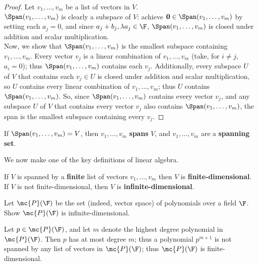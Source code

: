 \documentclass[math0540-lecture-notes.tex]{subfiles}
\begin{document}
\begin{proof}[Proof]
  Let $v_1,\ldots,v_m$ be a list of vectors in $V$.\\

  $\Span(v_1,\ldots,v_m)$ is clearly a subspace of $V$: achieve $\textbf{0}\in
  \Span(v_1,\ldots,v_m)$ by setting each $a_j=0$, and since $a_j+b_j,\lambda a_j\in \F$,
  $\Span(v_1,\ldots,v_m)$  is closed under addition and scalar multiplication.\\

  Now, we show that $\Span(v_1,\ldots,v_m)$ is the smallest subspace containing  $v_1,\ldots,v_m$.
  Every vector $v_j$ is a linear combination of $  v_1,\ldots,v_m$ (take, for $i\neq j$, $a_i=0$);
  thus $\Span(v_1,\ldots,v_m)$ contains each $v_j$. Additionally, every subspace $U$ of $V$ that
  contains each $v_j\in U$ is closed under addition and scalar multiplication, so $U$ contains every
  linear combination of $ v_1,\ldots,v_m$; thus $U$ contains $\Span(v_1,\ldots,v_m)$. So, since
  $\Span(v_1,\ldots,v_m)$ contains every vector $v_j$, and any subspace $U$ of $V$ that contains
  every vector $v_j$ also contains $\Span(v_1,\ldots,v_m)$, the span is the smallest subspace
  containing every $v_j$.
\end{proof}

\begin{definition}{}
  If $\Span(v_1,\ldots,v_m)=V$, then $ v_1,\ldots,v_m$ \textbf{spans} $V$, and $v_1,\ldots,v_m$ are
  a \textbf{spanning set}.
\end{definition}

We now make one of the key definitions of linear algebra.

\begin{definition}{}
  If $V$ is spanned by a \textbf{finite} list of vectors $v_1,\ldots,v_m$ then $V$ is
  \textbf{finite-dimensional}.\\

  If $V$ is not finite-dimensional, then $V$ is \textbf{infinite-dimensional}.
\end{definition}

\begin{example}
  Let $\mc{P}(\F)$ be the set (indeed, vector space) of polynomials over a field $\F$. Show
  $\mc{P}(\F)$ is infinite-dimensional.
\end{example}
\begin{solution}
  Let $p\in \mc{P}(\F)$, and let $m$ denote the highest degree polynomial in $\mc{P}(\F)$. Then $p$ 
  has at most degree $m $; thus a polynomial $p^{m+1}$ is not spanned by any list of vectors in
  $\mc{P}(\F)$; thus $\mc{P}(\F)$ is finite-dimensional.
\end{solution}
\end{document}
